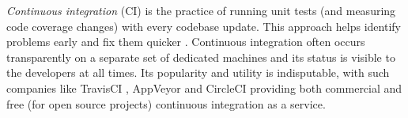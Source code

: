 \emph{Continuous integration} (CI) is the practice of running unit tests (and measuring code coverage changes) with every codebase update. This approach helps identify problems early and fix them quicker \cite{williams:2010:unit-tests-rock}. Continuous integration often occurs transparently on a separate set of dedicated machines and its status is visible to the developers at all times. Its popularity and utility is indisputable, with such companies like TravisCI \cite{travis:2017:homepage}, AppVeyor \cite{appveyor:2017:homepage} and CircleCI \cite{circleci:2017:homepage} providing both commercial and free (for open source projects) continuous integration as a service.
